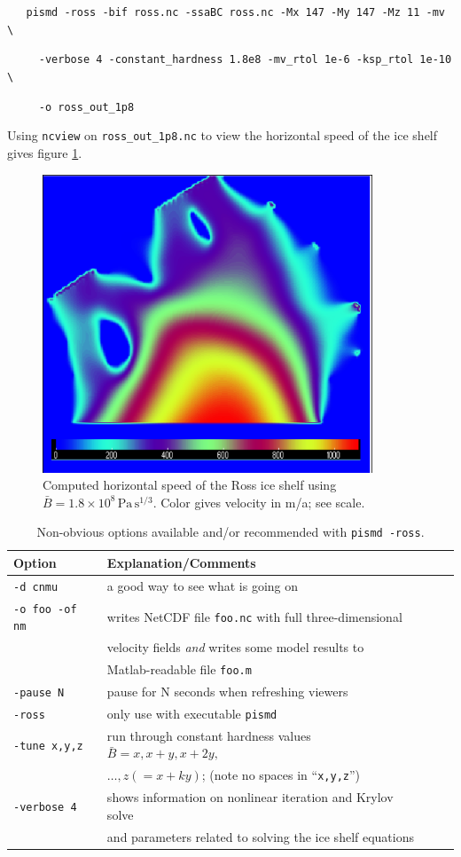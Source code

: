 \documentclass[11pt,final]{amsart}
\begin{document}
\verb|   pismd -ross -bif ross.nc -ssaBC ross.nc -Mx 147 -My 147 -Mz 11 -mv \|

\verb|     -verbose 4 -constant_hardness 1.8e8 -mv_rtol 1e-6 -ksp_rtol 1e-10 \|

\verb|     -o ross_out_1p8|

\noindent Using \verb|ncview| on \verb|ross_out_1p8.nc| to view the horizontal speed of the ice shelf gives figure \ref{fig:rossspeed1p8}.

\begin{figure}[ht]
\includegraphics[height=3.5in,keepaspectratio=true]{figs/rossspeed1p8}
\caption{Computed horizontal speed of the Ross ice shelf using $\bar B = 1.8 \times 10^8 \, \text{Pa}\, \text{s}^{1/3}$.  Color gives velocity in m/a; see scale.}
\label{fig:rossspeed1p8}
\end{figure}

\small
\begin{table}[h]
\caption{Non-obvious options available and/or recommended with \texttt{pismd -ross}.}\label{tab:rossoptions}
\begin{tabular}{@{}llll}\hline
\textbf{Option} & \textbf{Explanation/Comments} \\ \hline
  \verb|-d cnmu| &       a good way to see what is going on \\
  \verb|-o foo -of nm| &  writes NetCDF file \verb|foo.nc| with full three-dimensional \\
    & velocity fields \emph{and} writes some model results to \\
    & Matlab-readable file \verb|foo.m| \\
  \verb|-pause N| &      pause for N seconds when refreshing viewers \\
  \verb|-ross| &         only use with executable \verb|pismd| \\
  \verb|-tune x,y,z| &   run through constant hardness values $\bar B = x, x+y, x+2y,$ \\
 & $\dots, z(=x+ky)$; (note no spaces in ``\verb|x,y,z|'') \\
  \verb|-verbose 4| &      shows information on nonlinear iteration and Krylov solve \\
    & and parameters related to solving the ice shelf equations \\
\hline
\end{tabular}
\end{table}
\normalsize
\end{document}
